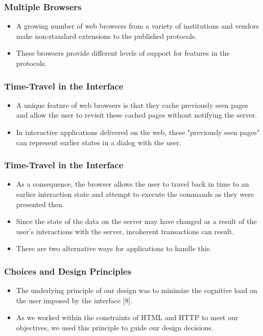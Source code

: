 \documentclass{beamer}
\begin{document}
\begin{frame}
\frametitle{Multiple Browsers}

\begin{itemize}
\item A growing number of web browsers from a variety of institutions and vendors make non-standard extensions to the published protocols.
\item These browsers provide different levels of support for features in the protocols.
\end{itemize}

\end{frame}

\begin{frame}
\frametitle{Time-Travel in the Interface}

\begin{itemize}
\item A unique feature of web browsers is that they cache previously seen pages and allow the user to revisit these cached pages without notifying the server.
\item In interactive applications delivered on the web, these "previously seen pages" can represent earlier states in a dialog with the user.
\end{itemize}

\end{frame}

\begin{frame}
\frametitle{Time-Travel in the Interface}

\begin{itemize}
\item As a consequence, the browser allows the user to travel back in time to an earlier interaction state and attempt to execute the commands as they were presented then.
\item Since the state of the data on the server may have changed as a result of the user's interactions with the server, incoherent transactions can result.
\item There are two alternative ways for applications to handle this.
\end{itemize}

\end{frame}

\begin{frame}
\frametitle{Choices and Design Principles}

\begin{itemize}
\item The underlying principle of our design was to minimize the cognitive load on the user imposed by the interface [8].
\item As we worked within the constraints of HTML and HTTP to meet our objectives, we used this principle to guide our design decisions.
\end{itemize}

\end{frame}
\end{document}
